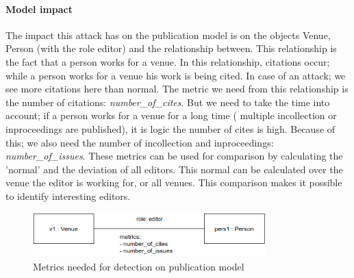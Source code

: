 \documentclass{ou-report}
\newcommand{\todo}[1]{{\color{red} TODO: #1}}
\begin{document}
\paragraph{Model impact}
The impact this attack has on the publication model is on the objects Venue, 
Person (with the role editor) and the relationship between. This relationship is 
the fact that a person works for a venue. In this relationship, citations occur; 
while a person works for a venue his work is being cited. In case of an attack; 
we see more citations here than normal. The metric we need from this 
relationship is the number of citations: \textit{number\_of\_cites}. But we need 
to take the time into account; if a person works for a venue for a long time (
multiple incollection or inproceedings are published), it is logic the number of 
cites is high. Because of this; we also need the number of incollection and 
inproceedings: \textit{number\_of\_issues}.
These metrics can be used for comparison by calculating the 'normal' and the 
deviation of all editors. This normal can be calculated over the venue the 
editor is working for, or all venues. This comparison makes it possible to 
identify interesting editors.

\begin{figure}[H]
\centering
\includegraphics[width=9cm]{images/cite_work_editorial_boardmodel_impact.drawio.png}
\caption{Metrics needed for detection on publication model}
\label{fig:cwebimpact}
\end{figure}

\end{document}
